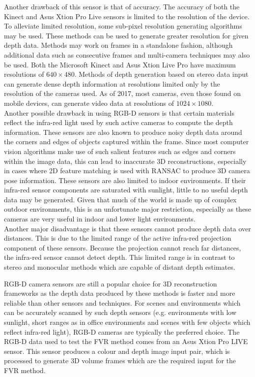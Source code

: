 Another drawback of this sensor is that of accuracy. The accuracy of both the Kinect and Asus Xtion Pro Live sensors is limited to the resolution of the device. To alleviate limited resolution, some sub-pixel resolution generating algorithms may be used. These methods can be used to generate greater resolution for given depth data. Methods may work on frames in a standalone fashion, although additional data such as consecutive frames and multi-camera techniques may also be used. Both the Microsoft Kinect and Asus Xtion Live Pro have maximum resolutions of $640 \times 480$. Methods of depth generation based on stereo data input can generate dense depth information at resolutions limited only by the resolution of the cameras used. As of 2017, most cameras, even those found on mobile devices, can generate video data at resolutions of $1024 \times 1080$. \\

Another possible drawback in using RGB-D sensors is that certain materials reflect the infra-red light used by such active cameras to compute the depth information. These sensors are also known to produce noisy depth data around the corners and edges of objects captured within the frame. Since most computer vision algorithms make use of such salient features such as edges and corners within the image data, this can lead to inaccurate 3D reconstructions, especially in cases where 2D feature matching is used with RANSAC to produce 3D camera pose information. These sensors are also limited to indoor environments. If their infra-red sensor components are saturated with sunlight, little to no useful depth data may be generated. Given that much of the world is made up of complex outdoor environments, this is an unfortunate major restriction, especially as these cameras are very useful in indoor and lower light environments. \\

Another major disadvantage is that these sensors cannot produce depth data over distances. This is due to the limited range of the active infra-red projection component of these sensors. Because the projection cannot reach far distances, the infra-red sensor cannot detect depth. This limited range is in contrast to stereo and monocular methods which are capable of distant depth estimates.  

RGB-D camera sensors are still a popular choice for 3D reconstruction frameworks as the depth data produced by these methods is faster and more reliable than other sensors and techniques. For scenes and environments which can be accurately scanned by such depth sensors (e.g. environments with low sunlight, short ranges as in office environments and scenes with few objects which reflect infra-red light), RGB-D cameras are typically the preferred choice. The RGB-D data used to test the FVR method comes from an Asus Xtion Pro LIVE sensor. This sensor produces a colour and depth image input pair, which is processed to generate 3D volume frames which are the required input for the FVR method. \\

